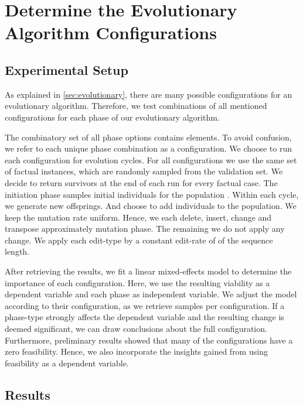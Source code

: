 \documentclass[./../../paper.tex]{subfiles}
\begin{document}
\section{Determine the Evolutionary Algorithm Configurations}

\subsection{Experimental Setup}
\label{sec:exp1}
As explained in \autoref{sec:evolutionary}, there are many possible configurations for an evolutionary algorithm. Therefore, we test combinations of all mentioned configurations for each phase of our evolutionary algorithm.

The combinatory set of all phase options contains  elements. To avoid confusion, we refer to each unique phase combination as a configuration. We choose to run each configuration for  evolution cycles. For all configurations we use the same set of  factual \glspl{instance}, which are randomly sampled from the validation set. We decide to return  survivors at the end of each run for every factual case. The initiation phase samples  initial individuals for the population . Within each cycle, we generate  new offsprings. And choose to add  individuals to the population. We keep the mutation rate uniform. Hence, we each delete, insert, change and transpose approximately  mutation phase. The remaining  we do not apply any change. We apply each edit-type by a constant edit-rate of  of the sequence length.

After retrieving the results, we fit a linear mixed-effects model to determine the importance of each configuration. Here, we use the resulting viability as a dependent variable and each phase as independent variable. We adjust the model according to their configuration, as we retrieve  samples per configuration. If a phase-type strongly affects the dependent variable and the resulting change is deemed significant, we can draw conclusions about the full configuration. Furthermore, preliminary results showed that many of the configurations have a zero feasibility. Hence, we also incorporate the insights gained from using feasibility as a dependent variable.

\subsection{Results}
\end{document}
